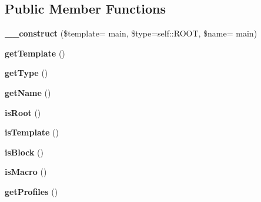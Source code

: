 \subsection*{Public Member Functions}
\begin{DoxyCompactItemize}
\item 
{\bfseries \+\_\+\+\_\+construct} (\$template= \textquotesingle{}main\textquotesingle{}, \$type=self\+::\+R\+O\+OT, \$name= \textquotesingle{}main\textquotesingle{})\hypertarget{classTwig__Profiler__Profile_a1b939644bfd916e8c3929df24cf7e68f}{}\label{classTwig__Profiler__Profile_a1b939644bfd916e8c3929df24cf7e68f}

\item 
{\bfseries get\+Template} ()\hypertarget{classTwig__Profiler__Profile_a688bc2d504bad7696f37c39068c1eac1}{}\label{classTwig__Profiler__Profile_a688bc2d504bad7696f37c39068c1eac1}

\item 
{\bfseries get\+Type} ()\hypertarget{classTwig__Profiler__Profile_ac804748f9ad9d2520a39bb4826f6bd16}{}\label{classTwig__Profiler__Profile_ac804748f9ad9d2520a39bb4826f6bd16}

\item 
{\bfseries get\+Name} ()\hypertarget{classTwig__Profiler__Profile_a9c3bab6f65edc7b9d0f7ee3a56f5d982}{}\label{classTwig__Profiler__Profile_a9c3bab6f65edc7b9d0f7ee3a56f5d982}

\item 
{\bfseries is\+Root} ()\hypertarget{classTwig__Profiler__Profile_a876fdb21906782b05a0a25f0fb339d94}{}\label{classTwig__Profiler__Profile_a876fdb21906782b05a0a25f0fb339d94}

\item 
{\bfseries is\+Template} ()\hypertarget{classTwig__Profiler__Profile_a0b48fa112c77c36c561e1325e14b7bac}{}\label{classTwig__Profiler__Profile_a0b48fa112c77c36c561e1325e14b7bac}

\item 
{\bfseries is\+Block} ()\hypertarget{classTwig__Profiler__Profile_adeb80e4e93a9ffce4962e9aa0e9d8176}{}\label{classTwig__Profiler__Profile_adeb80e4e93a9ffce4962e9aa0e9d8176}

\item 
{\bfseries is\+Macro} ()\hypertarget{classTwig__Profiler__Profile_a4aed8a37b3d1a2645c688a131add9086}{}\label{classTwig__Profiler__Profile_a4aed8a37b3d1a2645c688a131add9086}

\item 
{\bfseries get\+Profiles} ()\hypertarget{classTwig__Profiler__Profile_ace5ab9d553fc025277627b63d08b7846}{}\label{classTwig__Profiler__Profile_ace5ab9d553fc025277627b63d08b7846}


\end{DoxyCompactItemize}
